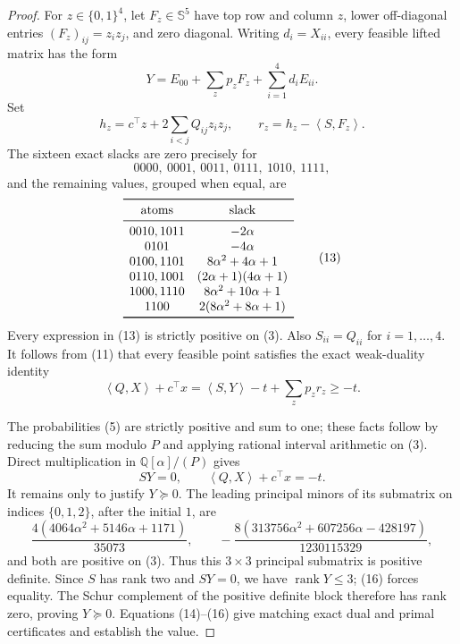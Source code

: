 \documentclass[11pt]{article}
\newcommand{\ip}[2]{\left\langle #1,#2\right\rangle}
\begin{document}
\begin{proof}
For $z\in\{0,1\}^4$, let $F_z\in\mathbb{S}^5$ have top row and column
$z$, lower off-diagonal entries $(F_z)_{ij}=z_i z_j$, and zero diagonal.
Writing $d_i=X_{ii}$, every feasible lifted matrix has the form
\begin{equation}
Y=E_{00}+\sum_z p_zF_z+\sum_{i=1}^4d_iE_{ii}.                      \tag{11}
\end{equation}
Set
\[
h_z=c^\top z+2\sum_{i<j}Q_{ij}z_i z_j,\qquad
r_z=h_z-\ip{S}{F_z}.
\]
The sixteen exact slacks are zero precisely for
\begin{equation}
0000,\ 0001,\ 0011,\ 0111,\ 1010,\ 1111,                         \tag{12}
\end{equation}
and the remaining values, grouped when equal, are
\begin{equation}
\begin{array}{c@{\quad}c}
\toprule
\text{atoms} & \text{slack}\\
\midrule
0010,1011 & -2\alpha\\
0101 & -4\alpha\\
0100,1101 & 8\alpha^2+4\alpha+1\\
0110,1001 & (2\alpha+1)(4\alpha+1)\\
1000,1110 & 8\alpha^2+10\alpha+1\\
1100 & 2(8\alpha^2+8\alpha+1)\\
\bottomrule
\end{array}                                                         \tag{13}
\end{equation}
Every expression in (13) is strictly positive on (3).  Also
$S_{ii}=Q_{ii}$ for $i=1,\ldots,4$.  It follows from (11) that every
feasible point satisfies the exact weak-duality identity
\begin{equation}
\ip{Q}{X}+c^\top x
=\ip{S}{Y}-t+\sum_z p_zr_z\geq-t.                                 \tag{14}
\end{equation}

The probabilities (5) are strictly positive and sum to one; these facts
follow by reducing the sum modulo $P$ and applying rational interval
arithmetic on (3).  Direct multiplication in $\mathbb{Q}[\alpha]/(P)$ gives
\begin{equation}
SY=0,\qquad \ip{Q}{X}+c^\top x=-t.                                \tag{15}
\end{equation}
It remains only to justify $Y\succeq0$.  The leading principal minors of
its submatrix on indices $\{0,1,2\}$, after the initial $1$, are
\begin{equation}
\frac{4(4064\alpha^2+5146\alpha+1171)}{35073},\qquad
-\frac{8(313756\alpha^2+607256\alpha-428197)}{1230115329},          \tag{16}
\end{equation}
and both are positive on (3).  Thus this $3\times3$ principal submatrix
is positive definite.  Since $S$ has rank two and $SY=0$, we have
$\operatorname{rank}Y\leq3$; (16) forces equality.  The Schur complement
of the positive definite block therefore has rank zero, proving
$Y\succeq0$.  Equations (14)--(16) give matching exact dual and primal
certificates and establish the value.


\end{proof}
\end{document}
